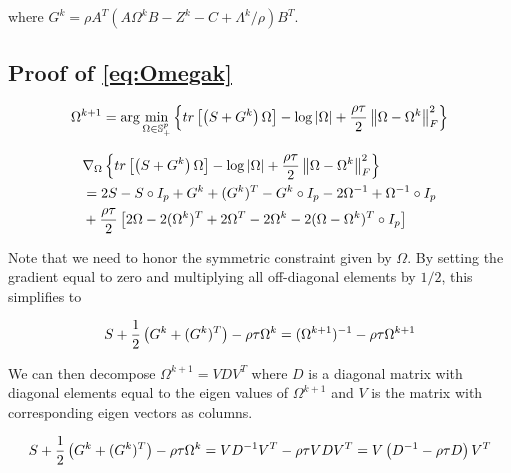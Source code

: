 \documentclass[11pt,]{report}
\begin{document}
where \(G^{k} = \rho A^{T}(A\Omega^{k}B - Z^{k} - C + \Lambda^{k}/\rho)B^{T}\).

\hypertarget{proofOmegak}{%
\subsection{Proof of \eqref{eq:Omegak}}\label{proofOmegak}}

\begin{equation}
\Omega^{k + 1} = \arg\min_{\Omega \in \mathbb{S}_{+}^{p}}\left\{tr\left[\left(S + G^{k}\right)\Omega\right] - \log\left|\Omega\right| + \frac{\rho\tau}{2}\left\|\Omega - \Omega^{k}\right\|_{F}^{2} \right\}
\label{eq:appendixomegaloglik2}\notag
\end{equation}

\begin{equation}
\begin{split}
  &\nabla_{\Omega}\left\{tr\left[\left(S + G^{k}\right)\Omega\right] - \log\left|\Omega\right| + \frac{\rho\tau}{2}\left\|\Omega - \Omega^{k}\right\|_{F}^{2} \right\} \\
  &= 2S - S\circ I_{p} + G^{k} + (G^{k})^{T} - G^{k}\circ I_{p} - 2\Omega^{-1} + \Omega^{-1}\circ I_{p} \\
  &+ \frac{\rho\tau}{2}\left[2\Omega - 2(\Omega^{k})^{T} + 2\Omega^{T} - 2\Omega^{k} - 2(\Omega - \Omega^{k})^{T}\circ I_{p} \right]
\label{eq:appendixomegagradient2}\notag
\end{split}
\end{equation}

Note that we need to honor the symmetric constraint given by \(\Omega\). By setting the gradient equal to zero and multiplying all off-diagonal elements by \(1/2\), this simplifies to

\begin{equation}
S + \frac{1}{2}\left(G^{k} + (G^{k})^{T}\right) - \rho\tau\Omega^{k} = (\Omega^{k + 1})^{-1} - \rho\tau\Omega^{k + 1} \notag
\end{equation}

We can then decompose \(\Omega^{k + 1} = VDV^{T}\) where \(D\) is a diagonal matrix with diagonal elements equal to the eigen values of \(\Omega^{k + 1}\) and \(V\) is the matrix with corresponding eigen vectors as columns.

\begin{equation}
S + \frac{1}{2}\left(G^{k} + (G^{k})^{T}\right) - \rho\tau\Omega^{k} = VD^{-1}V^{T} - \rho\tau VDV^{T} = V\left(D^{-1} - \rho\tau D\right)V^{T} \notag
\end{equation}
\end{document}
